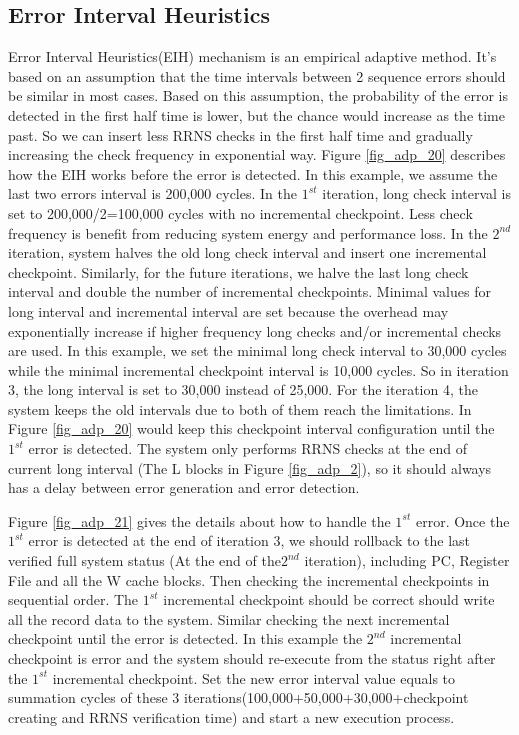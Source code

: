 \documentclass{sig-alternate}
\begin{document}
\subsection{Error Interval Heuristics}
Error Interval Heuristics(EIH) mechanism is an empirical adaptive method. It's based on an assumption that the time intervals between 2 sequence errors should be similar in most cases. Based on this assumption, the probability of the error is detected in the first half time is lower, but the chance would increase as the time past. So we can insert less RRNS checks in the first half time and gradually increasing the check frequency in exponential way. Figure \ref{fig_adp_20} describes how the EIH works before the error is detected. In this example, we assume the last two errors interval is 200,000 cycles. In the $1^{st}$ iteration, long check interval is set to 200,000/2=100,000 cycles with no incremental checkpoint. Less check frequency is benefit from reducing system energy and performance loss. In the $2^{nd}$ iteration, system halves the old long check interval and insert one incremental checkpoint. Similarly, for the future iterations, we halve the last long check interval and double the number of incremental checkpoints. Minimal values for long interval and incremental interval are set because the overhead may exponentially increase if higher frequency long checks and/or incremental checks are used. In this example, we set the minimal long check interval to 30,000 cycles while the minimal incremental checkpoint interval is 10,000 cycles. So in iteration 3, the long interval is set to 30,000 instead of 25,000. For the iteration 4, the system keeps the old intervals due to both of them reach the limitations. In Figure \ref{fig_adp_20} would keep this checkpoint interval configuration until the $1^{st}$  error is detected. The system only performs RRNS checks at the end of current long interval (The L blocks in Figure \ref{fig_adp_2}), so it should always has a delay between error generation and error detection. 

Figure \ref{fig_adp_21} gives the details about how to handle the $1^{st}$  error. Once the  $1^{st}$  error is detected at the end of iteration 3, we should rollback to the last verified full system status (At the end of the$2^{nd}$ iteration), including PC, Register File and all the W cache blocks. Then checking the incremental checkpoints in sequential order. The  $1^{st}$  incremental checkpoint should be correct should write all the record data to the system. Similar checking the next incremental checkpoint until the error is detected. In this example the $2^{nd}$ incremental checkpoint is error and the system should re-execute from the status right after the $1^{st}$  incremental checkpoint. Set the new error interval value equals to summation cycles of these 3 iterations(100,000+50,000+30,000+checkpoint creating and RRNS verification time) and start a new execution process. 
\end{document}
